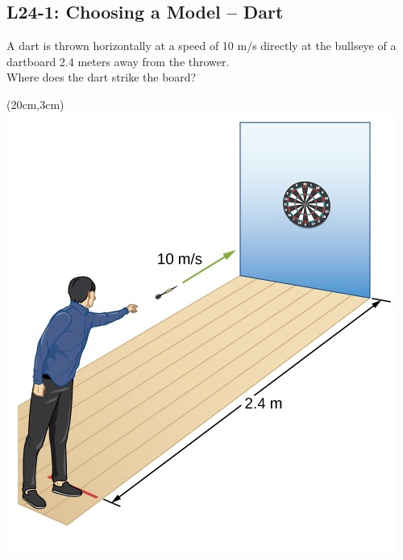 \documentclass[]{article}
\newcommand{\Week}{24}
\begin{document}
\begin{PresentSpace}
\vspace{-10pt}
\section*{L\Week-1: Choosing a Model -- Dart}
\vspace{-5pt}
A dart is thrown horizontally at a speed of 10 m/s directly at the bullseye of a dartboard 2.4 meters away from the thrower. \\

\noindent Where does the dart strike the board?
\end{PresentSpace}
\begin{textblock*}{5cm}(20cm,3cm)
	\includegraphics[scale=0.4]{DartThrow.png}
\end{textblock*}
\newpage
\end{document}
